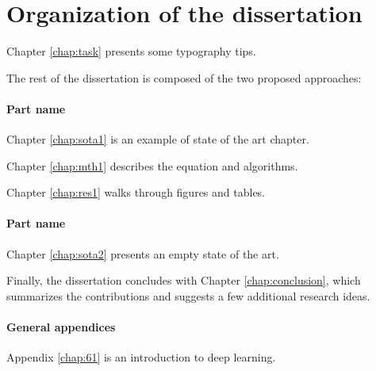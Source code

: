 \section{Organization of the dissertation}
\label{sec:overview:organization}

\begin{description}
    \item Chapter \ref{chap:task} presents some typography tips.
\end{description}

\newthought{} The rest of the dissertation is composed of the two proposed approaches:

\paragraph{Part name}
\begin{description}
    \item Chapter \ref{chap:sota1} is an example of state of the art chapter.
    \item Chapter \ref{chap:mth1} describes the equation and algorithms.
    \item Chapter \ref{chap:res1} walks through figures and tables.
\end{description}

\paragraph{Part name}
\begin{description}
    \item Chapter \ref{chap:sota2} presents an empty state of the art.
\end{description}

Finally, the dissertation concludes with Chapter \ref{chap:conclusion}, which summarizes the contributions and suggests a few additional research ideas.

\paragraph{General appendices}
\begin{description}
    \item Appendix \ref{chap:61} is an introduction to deep learning.
\end{description}

\vfill

